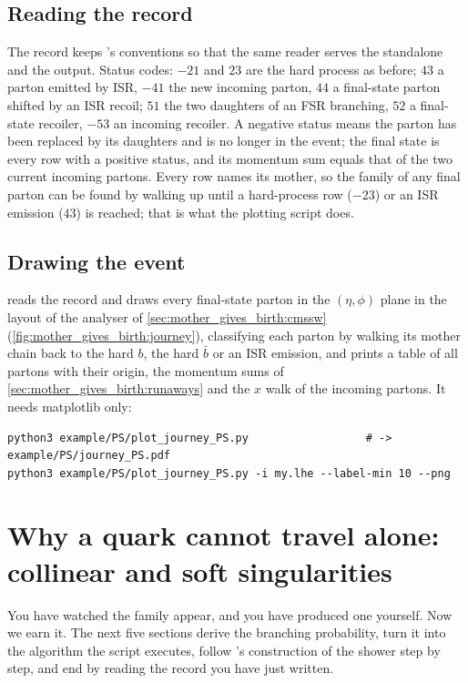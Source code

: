\subsection{Reading the record}
\label{sec:mother_gives_birth:record_format}

The record keeps \PYTHIA's conventions so that the same reader serves the
standalone and the \CMSSW output. Status codes: $-21$ and $23$ are the hard
process as before; $43$ a parton emitted by ISR, $-41$ the new incoming
parton, $44$ a final-state parton shifted by an ISR recoil; $51$ the two
daughters of an FSR branching, $52$ a final-state recoiler, $-53$ an
incoming recoiler. A negative status means the parton has been replaced by
its daughters and is no longer in the event; the final state is every row
with a positive status, and its momentum sum equals that of the two current
incoming partons. Every row names its mother, so the family of any final
parton can be found by walking up until a hard-process row ($-23$) or an
ISR emission ($43$) is reached; that is what the plotting script does.

\subsection{Drawing the event}

 reads the record and draws every
final-state parton in the $(\eta,\phi)$ plane in the layout of the \CMSSW
analyser of \cref{sec:mother_gives_birth:cmssw}
(\cref{fig:mother_gives_birth:journey}), classifying each parton by walking
its mother chain back to the hard $b$, the hard $\bar b$ or an ISR emission,
and prints a table of all partons with their origin, the momentum sums of
\cref{sec:mother_gives_birth:runaways} and the $x$ walk of the incoming
partons. It needs matplotlib only:
\begin{verbatim}
python3 example/PS/plot_journey_PS.py                  # -> example/PS/journey_PS.pdf
python3 example/PS/plot_journey_PS.py -i my.lhe --label-min 10 --png
\end{verbatim}

\section{Why a quark cannot travel alone: collinear and soft singularities}
\label{sec:mother_gives_birth:why_alone}

You have watched the family appear, and you have produced one yourself. Now
we earn it. The next five sections derive the branching probability, turn
it into the algorithm the script executes, follow \PYTHIA's construction of
the shower step by step, and end by reading the record you have just
written.

